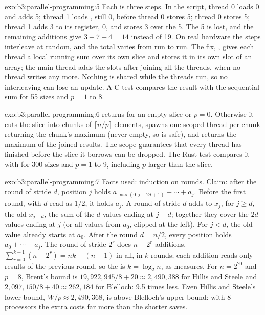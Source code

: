 \begin{solution}{exo:b3:parallel-programming:5}
Each \code{+=} is three steps. In the script, thread 0 loads 0 and adds 5; thread 1 loads , still 0, before thread 0 stores 5; thread 0 stores 5; thread 1 adds 3 to its register, 0, and stores 3 over the 5. The 5 is lost, and the remaining additions give $3 + 7 + 4 = 14$ instead of 19. On real hardware the steps interleave at random, and the total varies from run to run. The fix, , gives each thread a local running sum over its own slice and stores it in its own slot of an array; the main thread adds the slots after joining all the threads, when no thread writes any more. Nothing is shared while the threads run, so no interleaving can lose an update. A C test compares the result with the sequential sum for 55 sizes and $p = 1$ to 8.
\end{solution}

\begin{solution}{exo:b3:parallel-programming:6}
 returns  for an empty slice or $p = 0$. Otherwise it cuts the slice into chunks of $\lceil n/p \rceil$ elements, spawns one scoped thread per chunk returning the chunk's maximum (never empty, so  is safe), and returns the maximum of the joined results. The scope guarantees that every thread has finished before the slice it borrows can be dropped. The Rust test compares it with  for 300 sizes and $p = 1$ to 9, including $p$ larger than the slice.
\end{solution}

\begin{solution}{exo:b3:parallel-programming:7}
Facts used: induction on rounds. Claim: after the round of stride $d$, position $j$ holds $a_{\max(0, j - 2d + 1)} + \cdots + a_j$. Before the first round, with $d$ read as $1/2$, it holds $a_j$. A round of stride $d$ adds to $x_j$, for $j \ge d$, the old $x_{j-d}$, the sum of the $d$ values ending at $j - d$; together they cover the $2d$ values ending at $j$ (or all values from $a_0$, clipped at the left). For $j < d$, the old value already starts at $a_0$. After the round $d = n/2$, every position holds $a_0 + \cdots + a_j$. The round of stride $2^r$ does $n - 2^r$ additions, $\sum_{r=0}^{k-1} (n - 2^r) = nk - (n - 1)$ in all, in $k$ rounds; each addition reads only results of the previous round, so the  is $k = \log_2 n$, as  measures. For $n = 2^{20}$ and $p = 8$, Brent's bound is $19{,}922{,}945/8 + 20 \approx 2{,}490{,}388$ for Hillis and Steele and $2{,}097{,}150/8 + 40 \approx 262{,}184$ for Blelloch: 9.5 times less. Even Hillis and Steele's lower bound, $W/p \approx 2{,}490{,}368$, is above Blelloch's upper bound: with 8 processors the extra  costs far more than the shorter  saves.
\end{solution}

